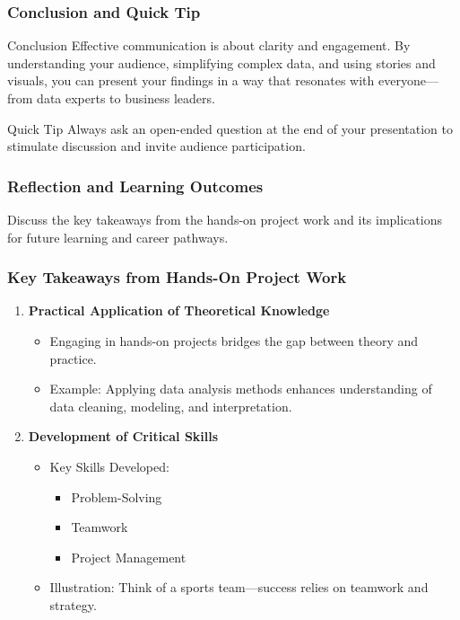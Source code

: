 \documentclass{beamer}
\begin{document}
\begin{frame}[fragile]
    \frametitle{Conclusion and Quick Tip}
    \begin{block}{Conclusion}
        Effective communication is about clarity and engagement. By understanding your audience, simplifying complex data, and using stories and visuals, you can present your findings in a way that resonates with everyone—from data experts to business leaders.
    \end{block}
    
    \begin{block}{Quick Tip}
        Always ask an open-ended question at the end of your presentation to stimulate discussion and invite audience participation.
    \end{block}
\end{frame}

\begin{frame}[fragile]
    \frametitle{Reflection and Learning Outcomes}
    Discuss the key takeaways from the hands-on project work and its implications for future learning and career pathways.
\end{frame}

\begin{frame}[fragile]
    \frametitle{Key Takeaways from Hands-On Project Work}
    \begin{enumerate}
        \item \textbf{Practical Application of Theoretical Knowledge}
        \begin{itemize}
            \item Engaging in hands-on projects bridges the gap between theory and practice.
            \item Example: Applying data analysis methods enhances understanding of data cleaning, modeling, and interpretation.
        \end{itemize}

        \item \textbf{Development of Critical Skills}
        \begin{itemize}
            \item Key Skills Developed:
            \begin{itemize}
                \item Problem-Solving
                \item Teamwork
                \item Project Management
            \end{itemize}
            \item Illustration: Think of a sports team—success relies on teamwork and strategy.
        \end{itemize}
    \end{enumerate}
\end{frame}
\end{document}
